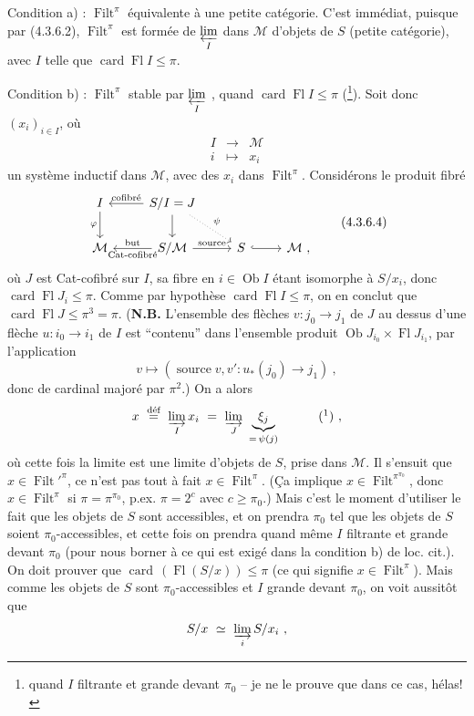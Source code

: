 \documentclass[11pt]{article}
\newcommand{\printedpage}[1]{\marginpar{\footnotesize p.~#1}}
\newcommand{\msp}[1]{\marginpar{\footnotesize [#1]}}
\newcommand{\Ob}{\operatorname{Ob}}
\newcommand{\card}{\operatorname{card}}
\newcommand{\Fl}{\operatorname{Fl}}
\newcommand{\Filt}{\operatorname{Filt}}
\begin{document}
\printedpage{13}

\noindent\msp{page 74}Condition a) : $\Filt^\pi$ équivalente à une petite catégorie. C'est immédiat, puisque par (4.3.6.2), $\Filt^\pi$ est formée de $\varprojlim\limits_I$ dans $\mathcal M$ d'objets de $S$ (petite catégorie), avec $I$ telle que $\card\Fl I\leqslant\pi$.

\noindent Condition b) : $\Filt^\pi$ stable par $\varprojlim\limits_I$ , quand $\card\Fl I\leqslant\pi$ (\footnote{quand $I$ filtrante et grande devant $\pi_0$ -- je ne le prouve que dans ce cas, hélas!}). Soit donc $(x_i)_{i\in I}$, où
\[
\begin{array}{ccc}
I & \longrightarrow & \mathcal M\\[1ex]
i & \longmapsto & x_i
\end{array}
\]
un système inductif dans $\mathcal M$, avec des $x_i$ dans $\Filt^\pi$. Considérons le produit fibré
\[
\begin{tikzcd}
I \arrow[d, "\varphi"'] & S/I = J \arrow[l, "\text{cofibré}"'] \arrow[d] \arrow[dr, dotted, "\psi"] & & \\
\mathcal M & S/\mathcal M \arrow[l, "\text{but}"', "\text{Cat-cofibré}"] \arrow[r, "\text{source}"] & S \arrow[r, hook] & \mathcal M\ ,
\end{tikzcd}
\tag*{(4.3.6.4)}
\]
où $J$ est Cat-cofibré sur $I$, sa fibre en $i\in\Ob I$ étant isomorphe à $S/x_i$, donc $\card\Fl J_i\leqslant\pi$. Comme par hypothèse $\card\Fl I\leqslant\pi$, on en conclut que $\card\Fl J\leqslant\pi^3=\pi$. (\textbf{N.B.} L'ensemble des flèches $v:j_0\longrightarrow j_1$ de $J$ au dessus d'une flèche $u:i_0\longrightarrow i_1$ de $I$ est “contenu” dans l'ensemble produit $\Ob J_{i_0}\times\Fl J_{i_1}$, par l'application
\[
v\longmapsto(\operatorname{source}v,v':u_*(j_0)\longrightarrow j_1)\ ,
\]
donc de cardinal majoré par $\pi^2$.) On \msp{page 75}a alors
\[
x\ \overset{\text{déf}}{=}\ \varinjlim_I x_i\ =\ \varinjlim_J\ \underbrace{\xi_j}_{=\,\psi(j)}\qquad\quad\mbox{(\footnotemark)}\ ,
\]
%
où cette fois la limite est une limite d'objets de $S$, prise dans $\mathcal M$. Il s'ensuit que $x\in\Filt'^{\pi}$, ce n'est pas tout à fait $x\in\Filt^\pi$. (Ça implique $x\in\Filt^{\pi^{\pi_0}}$, donc $x\in\Filt^\pi$ si $\pi=\pi^{\pi_0}$, p.ex. $\pi=2^c$ avec $c\geqslant\pi_0$.) Mais c'est le moment d'utiliser le fait que les objets de $S$ sont accessibles, et on prendra $\pi_0$ tel que les objets de $S$ soient $\pi_0$-accessibles, et cette fois on prendra quand même $I$ filtrante et grande devant $\pi_0$ (pour nous borner à ce qui est exigé dans la condition b) de loc. cit.). On doit prouver que $\card\,(\Fl(S/x))\leqslant\pi$ (ce qui signifie $x\in\Filt^\pi$). Mais comme les objets de $S$ sont $\pi_0$-accessibles et $I$ grande devant $\pi_0$, on voit aussitôt que
\[
S/x\ \simeq\ \varinjlim_i S/x_i\ ,
\]
\end{document}
